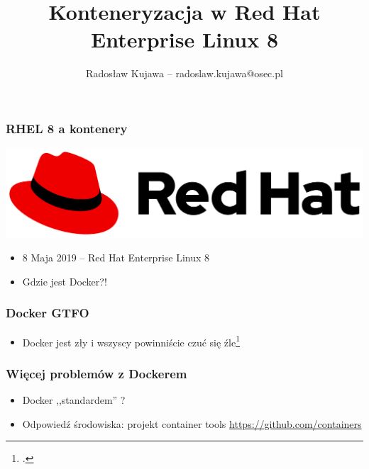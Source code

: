 \documentclass[dvipsnames,table]{beamer}
\title{Konteneryzacja w Red Hat Enterprise Linux 8}
\author{Radosław Kujawa -- radoslaw.kujawa@osec.pl}
\institute{OSEC}
\begin{document}
\begin{frame}
	\titlepage
\end{frame}

\begin{frame}
\frametitle{RHEL 8 a kontenery}
\begin{center}
\includegraphics[scale=0.1]{img-rhlogo.png}
\end{center}
\begin{itemize}
	\item 8 Maja 2019 -- Red Hat Enterprise Linux 8
	\item Gdzie jest Docker?!
\end{itemize}
\begin{center}
\end{center}
\end{frame}

\begin{frame}
	\frametitle{Docker GTFO}
	\begin{itemize}
		\item Docker jest zły i wszyscy powinniście czuć się źle\footcite{Barcamp2016}
	\end{itemize}
\end{frame}

\begin{frame}
	\frametitle{Więcej problemów z Dockerem}
	\begin{itemize}
		\item Docker ,,standardem'' ?
	\end{itemize}
\end{frame}

\begin{frame}
	\begin{itemize}
		\item Odpowiedź środowiska: projekt container tools \url{https://github.com/containers} 
	\end{itemize}
\end{frame}
\end{document}
